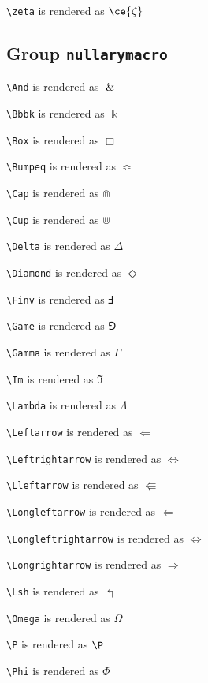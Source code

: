\texttt{\textbackslash zeta} is rendered as $\ce{\zeta}$

\subsection{ Group \texttt{nullary\textunderscore macro}}

\texttt{\textbackslash And} is rendered as $\And$

\texttt{\textbackslash Bbbk} is rendered as $\Bbbk$

\texttt{\textbackslash Box} is rendered as $\Box$

\texttt{\textbackslash Bumpeq} is rendered as $\Bumpeq$

\texttt{\textbackslash Cap} is rendered as $\Cap$

\texttt{\textbackslash Cup} is rendered as $\Cup$

\texttt{\textbackslash Delta} is rendered as $\Delta$

\texttt{\textbackslash Diamond} is rendered as $\Diamond$

\texttt{\textbackslash Finv} is rendered as $\Finv$

\texttt{\textbackslash Game} is rendered as $\Game$

\texttt{\textbackslash Gamma} is rendered as $\Gamma$

\texttt{\textbackslash Im} is rendered as $\Im$

\texttt{\textbackslash Lambda} is rendered as $\Lambda$

\texttt{\textbackslash Leftarrow} is rendered as $\Leftarrow$

\texttt{\textbackslash Leftrightarrow} is rendered as $\Leftrightarrow$

\texttt{\textbackslash Lleftarrow} is rendered as $\Lleftarrow$

\texttt{\textbackslash Longleftarrow} is rendered as $\Longleftarrow$

\texttt{\textbackslash Longleftrightarrow} is rendered as $\Longleftrightarrow$

\texttt{\textbackslash Longrightarrow} is rendered as $\Longrightarrow$

\texttt{\textbackslash Lsh} is rendered as $\Lsh$

\texttt{\textbackslash Omega} is rendered as $\Omega$

\texttt{\textbackslash P} is rendered as $\P$

\texttt{\textbackslash Phi} is rendered as $\Phi$

